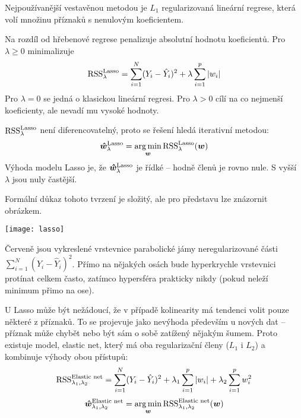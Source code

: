 \documentclass[../main.tex]{subfiles}
\begin{document}
Nejpoužívanější vestavěnou metodou je $L_1$ regularizovaná lineární regrese, která volí množinu příznaků s nenulovým koeficientem.

Na rozdíl od hřebenové regrese penalizuje absolutní hodnotu koeficientů. Pro $\lambda \ge 0$ minimalizuje
\[
    \operatorname{RSS}_\lambda^{\text{Lasso}} = \sum_{i=1}^{N} (Y_i - \hat{Y}_i)^2
    + \lambda \sum_{i=1}^{p} |w_i|
\]
Pro $\lambda = 0$ se jedná o klasickou lineární regresi. Pro $\lambda > 0$ cílí na co nejmenší koeficienty, ale nevadí mu vysoké hodnoty.

$\operatorname{RSS}_\lambda^{\text{Lasso}}$ není diferencovatelný, proto se řešení hledá iterativní metodou:
\[
    \bm{\hat{w}}_\lambda^{\text{Lasso}} = \operatorname*{arg\,min}_{\bm{w}} \operatorname{RSS}_\lambda^{\text{Lasso}} (\bm{w})
\]
Výhoda modelu Lasso je, že $\bm{\hat{w}}_\lambda^{\text{Lasso}}$ je řídké -- hodně členů je rovno nule. S vyšší $\lambda$ jsou nuly častější.

Formální důkaz tohoto tvrzení je složitý, ale pro představu lze znázornit obrázkem.

\begin{center}
    \texttt{[image: lasso]}
\end{center}

Červeně jsou vykreslené vrstevnice parabolické jámy neregularizované části ${\sum_{i=1}^{N} (Y_i - \hat{Y}_i)^2}$. Přímo na nějakých osách bude hyperkrychle vrstevnici protínat celkem často, zatímco hypersféra prakticky nikdy (pokud neleží minimum přimo na ose).

U Lasso může být nežádoucí, že v případě kolinearity má tendenci volit pouze některé z příznaků. To se projevuje jako nevýhoda především u nových dat -- příznak může chybět nebo být sám o sobě zatížený nějakým šumem. Proto existuje model, elastic net, který má oba regularizační členy ($L_1$ i $L_2$) a kombinuje výhody obou přístupů:
\[
    \operatorname{RSS}_{\lambda_1, \lambda_2}^{\text{Elastic net}} = \sum_{i=1}^{N} (Y_i - \hat{Y}_i)^2
    + \lambda_1 \sum_{i=1}^{p} |w_i|
    + \lambda_2 \sum_{i=1}^{p} w_i^2
\]
\[
    \bm{\hat{w}}_{\lambda_1, \lambda_2}^{\text{Elastic net}}
    = \operatorname*{arg\,min}_{\bm{w}} \operatorname{RSS}_{\lambda_1, \lambda_2}^{\text{Elastic net}} (\bm{w})
\]
\end{document}
